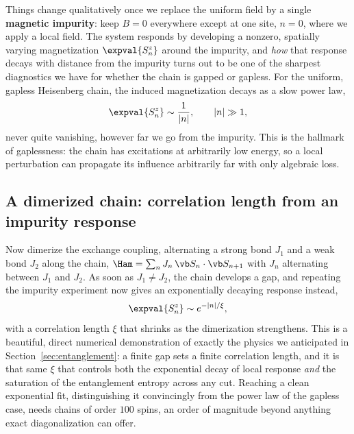 \documentclass[all_sessions.tex]{subfiles}
\begin{document}
Things change qualitatively once we replace the uniform field by a single \textbf{magnetic
impurity}: keep $B=0$ everywhere except at one site, $n=0$, where we apply a local field. The
system responds by developing a nonzero, spatially varying magnetization $\expval{S_n^z}$ around
the impurity, and \emph{how} that response decays with distance from the impurity turns out to be
one of the sharpest diagnostics we have for whether the chain is gapped or gapless. For the
uniform, gapless Heisenberg chain, the induced magnetization decays as a slow power law,
\begin{equation}
  \expval{S_n^z} \sim \frac{1}{|n|}, \qquad |n| \gg 1,
  \label{eq:powerlawdecay}
\end{equation}
never quite vanishing, however far we go from the impurity. This is the hallmark of gaplessness:
the chain has excitations at arbitrarily low energy, so a local perturbation can propagate its
influence arbitrarily far with only algebraic loss.

\subsection{A dimerized chain: correlation length from an impurity response}
Now dimerize the exchange coupling, alternating a strong bond $J_1$ and a weak bond $J_2$ along the
chain, $\Ham = \sum_n J_n\,\vb S_n\cdot\vb S_{n+1}$ with $J_n$ alternating between $J_1$ and $J_2$.
As soon as $J_1\ne J_2$, the chain develops a gap, and repeating the impurity experiment now gives
an exponentially decaying response instead,
\begin{equation}
  \expval{S_n^z} \sim e^{-|n|/\xi},
  \label{eq:expdecay}
\end{equation}
with a correlation length $\xi$ that shrinks as the dimerization strengthens. This is a beautiful,
direct numerical demonstration of exactly the physics we anticipated in
Section~\ref{sec:entanglement}: a finite gap sets a finite correlation length, and it is that same
$\xi$ that controls both the exponential decay of local response \emph{and} the saturation of the
entanglement entropy across any cut. Reaching a clean exponential fit, distinguishing it
convincingly from the power law of the gapless case, needs chains of order $100$ spins, an order of
magnitude beyond anything exact diagonalization can offer.
\end{document}
